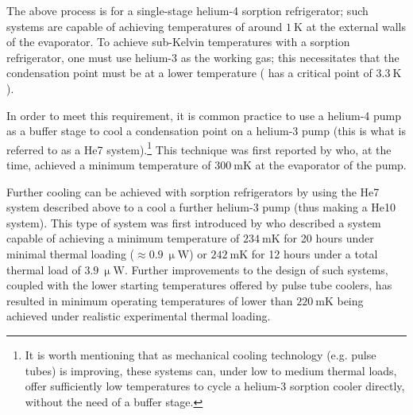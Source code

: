 \par
The above process is for a single-stage helium-4 sorption refrigerator; such systems are capable of achieving temperatures of around $1~\mathrm{K}$ at the external walls of the evaporator. To achieve sub-Kelvin temperatures with a sorption refrigerator, one must use helium-3 as the working gas; this necessitates that the condensation point must be at a lower temperature ( has a critical point of $3.3~\mathrm{K}$). 
\par 
In order to meet this requirement, it is common practice to use a helium-4 pump as a buffer stage to cool a condensation point on a helium-3 pump (this is what is referred to as a He7 system).\footnote{It is worth mentioning that as mechanical cooling technology (e.g. pulse tubes) is improving, these systems can, under low to medium thermal loads, offer sufficiently low temperatures to cycle a helium-3 sorption cooler directly, without the need of a buffer stage.} This technique was first reported by \textcite{DallOglio1991} who, at the time, achieved a minimum temperature of $300~\mathrm{mK}$ at the evaporator of the  pump.
\par 
Further cooling can be achieved with sorption refrigerators by using the He7 system described above to a cool a further helium-3 pump (thus making a He10 system). This type of system was first introduced by \textcite{Bhatia2000} who described a system capable of achieving a minimum temperature of $234~\mathrm{mK}$ for 20 hours under minimal thermal loading ($\approx 0.9~\mathrm{\upmu W}$) or $242~\mathrm{mK}$ for 12 hours under a total thermal load of $3.9~\mathrm{\upmu W}$. Further improvements to the design of such systems, coupled with the lower starting temperatures offered by pulse tube coolers, has resulted in minimum operating temperatures of lower than $220~\mathrm{mK}$ being achieved under realistic experimental thermal loading.
%
